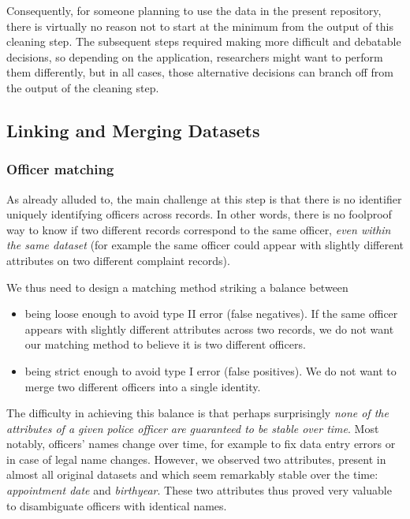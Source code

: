 Consequently, for someone planning to use the data in the present repository,
there is virtually no reason not to start at the minimum from the output of
this cleaning step. The subsequent steps required making more difficult and
debatable decisions, so depending on the application, researchers might want to
perform them differently, but in all cases, those alternative decisions can
branch off from the output of the cleaning step.

\subsection{Linking and Merging Datasets}\label{sec:linking}

\subsubsection{Officer matching}

As already alluded to, the main challenge at this step is that there is no
identifier uniquely identifying officers across records. In other words, there
is no foolproof way to know if two different records correspond to the same
officer, \emph{even within the same dataset} (for example the same officer
could appear with slightly different attributes on two different complaint
records).

We thus need to design a matching method striking a balance between
\begin{itemize}
	\item being loose enough to avoid type II error (false negatives). If the
		same officer appears with slightly different attributes across two
		records, we do not want our matching method to believe it is two
		different officers.
	\item being strict enough to avoid type I error (false positives). We do
		not want to merge two different officers into a single identity.
\end{itemize}

The difficulty in achieving this balance is that perhaps surprisingly
\emph{none of the attributes of a given police officer are guaranteed to be
stable over time}. Most notably, officers' names change over time, for example
to fix data entry errors or in case of legal name changes. However, we observed
two attributes, present in almost all original datasets and which seem
remarkably stable over the time: \emph{appointment date} and \emph{birthyear}.
These two attributes thus proved very valuable to disambiguate officers with
identical names.


